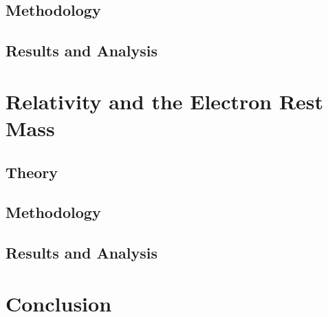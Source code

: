 \documentclass[%
reprint,
amsmath,amssymb,
aps,
]{revtex4-2}
\begin{document}
		\subsection{Methodology}
		
		\subsection{Results and Analysis}
		
	\section{Relativity and the Electron Rest Mass}
	
		\subsection{Theory}
		
		\subsection{Methodology}
		
		\subsection{Results and Analysis}


	\section{Conclusion}

		
		
	\clearpage

		
\end{document}
